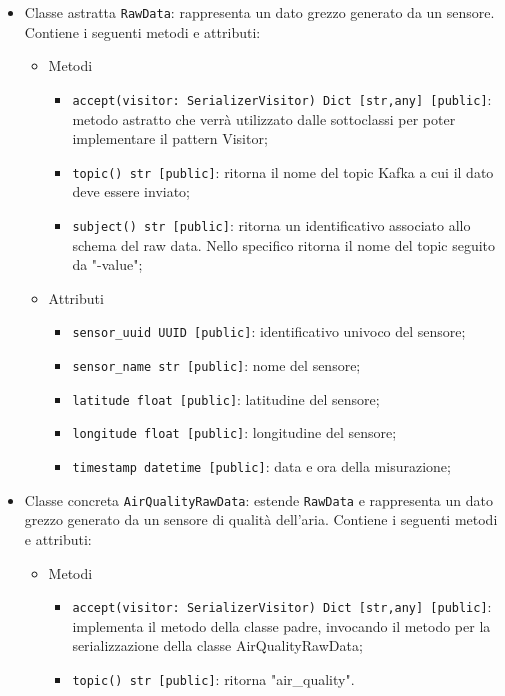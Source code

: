 \begin{itemize}
    \item Classe astratta \texttt{RawData}: rappresenta un dato grezzo generato da un sensore. Contiene i seguenti metodi e attributi:
    \begin{itemize}
        \item Metodi
        \begin{itemize}
            \item \texttt{accept(visitor: SerializerVisitor) Dict [str,any] [public]}: metodo astratto che verrà utilizzato dalle sottoclassi per poter implementare il pattern Visitor;
            \item \texttt{topic() str [public]}: ritorna il nome del topic Kafka a cui il dato deve essere inviato;
            \item \texttt{subject() str [public]}: ritorna un identificativo associato allo schema del raw data. Nello specifico ritorna il nome del topic seguito da "-value";
        \end{itemize}
        \item Attributi
        \begin{itemize}
            \item \texttt{sensor\_uuid UUID [public]}: identificativo univoco del sensore;
            \item \texttt{sensor\_name str [public]}: nome del sensore;
            \item \texttt{latitude float [public]}: latitudine del sensore;
            \item \texttt{longitude float [public]}: longitudine del sensore;
            \item \texttt{timestamp datetime [public]}: data e ora della misurazione;
        \end{itemize}
    \end{itemize}
    \item Classe concreta \texttt{AirQualityRawData}: estende \texttt{RawData} e rappresenta un dato grezzo generato da un sensore di qualità dell'aria. Contiene i seguenti metodi e attributi:
    \begin{itemize}
        \item Metodi
        \begin{itemize}
            \item \texttt{accept(visitor: SerializerVisitor) Dict [str,any] [public]}: implementa il metodo della classe padre, invocando il metodo per la serializzazione della classe AirQualityRawData;
            \item \texttt{topic() str [public]}: ritorna "air\_quality".

\end{itemize}
\end{itemize}
\end{itemize}
